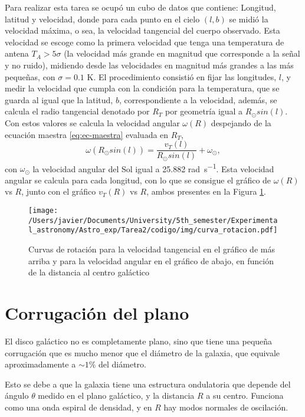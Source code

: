\documentclass[letterpaper,oneside]{article}
\begin{document}
Para realizar esta tarea se ocupó un cubo de datos que contiene: Longitud, latitud y velocidad, donde para cada punto en el cielo $(l,b)$ se midió la velocidad máxima, o sea, la velocidad tangencial del cuerpo observado. Esta velocidad se escoge como la primera velocidad que tenga una temperatura de antena $T_A>5\sigma$ (la velocidad más grande en magnitud que corresponde a la señal y no ruido), midiendo desde las velocidades en magnitud más grandes a las más pequeñas, con $\sigma =0.1$ \si{\kelvin}. El procedimiento consistió en fijar las longitudes, $l$, y medir la velocidad que cumpla con la condición para la temperatura, que se guarda al igual que la latitud, $b$, correspondiente a la velocidad, además, se calcula el radio tangencial denotado por $R_T$ por geometría igual a $R_{\odot}sin(l)$. Con estos valores se calcula la velocidad angular $\omega(R)$ despejando de la ecuación maestra \ref{eq:ec-maestra} evaluada en $R_T$,
\begin{equation*}
\omega(R_{\odot}sin(l))=\frac{v_T(l)}{R_{\odot}sin(l)}+\omega_{\odot},
\end{equation*}
con $\omega_{\odot}$ la velocidad angular del Sol igual a 25.882 \si{\radian\per\second}. Esta velocidad angular se calcula para cada longitud, con lo que se consigue el gráfico de $\omega(R)$ vs $R$, junto con el gráfico $v_T(R)$ vs $R$, ambos presentes en la Figura \ref{fig:curva-rotacion}.
\begin{figure}[H]
    \centering
    \texttt{[image: /Users/javier/Documents/University/5th\_semester/Experimental\_astronomy/Astro\_exp/Tarea2/codigo/img/curva\_rotacion.pdf]}
    \caption{Curvas de rotación para la velocidad tangencial en el gráfico de más arriba y para la velocidad angular en el gráfico de abajo, en función de la distancia al centro galáctico}
    \label{fig:curva-rotacion}
\end{figure}
\newpage
\section{Corrugación del plano}
El disco galáctico no es completamente plano, sino que tiene una pequeña corrugación que es mucho menor que el diámetro de la galaxia, que equivale aproximadamente a  $\sim 1\%$ del diámetro.

Esto se debe a que la galaxia tiene una estructura ondulatoria que depende del ángulo $\theta$ medido en el plano galáctico, y la distancia $R$ a su centro. Funciona como una onda espiral de densidad, y en $R$ hay modos normales de oscilación. %
\end{document}
